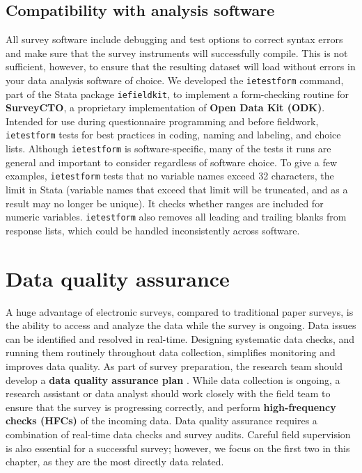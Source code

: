 \subsection{Compatibility with analysis software}
All survey software include debugging and test options to correct syntax errors and make sure that the survey instruments will successfully compile.
This is not sufficient, however, to ensure that the resulting dataset will load without errors in your data analysis software of choice.
We developed the \texttt{ietestform} 
command, part of 
the Stata package
\texttt{iefieldkit}, to implement a form-checking routine for \textbf{SurveyCTO}, a proprietary implementation of \textbf{Open Data Kit (ODK)}.
Intended for use during questionnaire programming and before fieldwork, 
\texttt{ietestform} tests for best practices in coding, naming and labeling, 
and choice lists.
Although \texttt{ietestform} is software-specific, many of the tests it runs are general and important to consider regardless of software choice.
To give a few examples, \texttt{ietestform} tests that no variable names exceed 
32 characters, the limit in Stata (variable names that exceed that limit will 
be truncated, and as a result may no longer be unique). It checks whether 
ranges are included for numeric variables.
\texttt{ietestform} also removes all leading and trailing blanks from response lists, which could be handled inconsistently across software.


\section{Data quality assurance}
A huge advantage of electronic surveys, compared to traditional paper surveys, is the ability to access and analyze the data while the survey is ongoing.
Data issues can be identified and resolved in real-time. Designing systematic data checks, and running them routinely throughout data collection, simplifies monitoring and improves data quality.
As part of survey preparation, the research team should develop a \textbf{data quality assurance plan} .
While data collection is ongoing, a research assistant or data analyst should work closely with the field team to ensure that the survey is progressing correctly, and perform \textbf{high-frequency checks (HFCs)} of the incoming data.
Data quality assurance requires a combination of real-time data checks and survey audits. Careful field supervision is also essential for a successful survey; however, we focus on the first two in this chapter, as they are the most directly data related.


